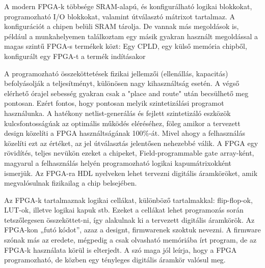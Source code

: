 \documentclass[a4paper,12pt,oneside]{book}
\begin{document}
A modern FPGA-k többsége SRAM-alapú, és konfigurálható logikai blokkokat, programozható I/O blokkokat, valamint útválasztó mátrixot tartalmaz. A konfigurációt a chipen belüli SRAM tárolja. De vannak más megoldások is, például a munkahelyemen találkoztam egy másik gyakran használt megoldással a magas szintű FPGA-s termékek közt: Egy CPLD, egy külső memória chipből, konfigurált egy FPGA-t a termék indításakor

A programozható összeköttetések fizikai jellemzői (ellenállás, kapacitás) befolyásolják a teljesítményt, különösen nagy kihasználtság esetén. A végső elérhető órajel sebesség gyakran csak a "place and route" után becsülhető meg pontosan. Ezért fontos, hogy pontosan melyik szintetizálási programot használunka. A hatékony netlist-generálás és fejlett szintetizáló eszközök kulcsfontosságúak az optimális működés eléréséhez, föleg amikor a tervezett design közelíti a FPGA használtságának 100\%-át. Mivel ahogy a felhasználás közelíti ezt az értéket, az jel útválasztás jelentősen nehezebbé válik.
\iffalse
A FPGA egy rövidítés, teljes nevükön ezeket a chipeket, Field-programmable gate array-ként, magyarul a felhasználás helyén programozható logikai kapumátrixokként ismerjük. Az FPGA-ra HDL nyelveken lehet tervezni digitális áramköröket, amik megvalósulnak fizikailag a chip belsejében. 

Az FPGA-k tartalmaznak logikai cellákat, különböző tartalmakkal: flip-flop-ok, LUT-ok, illetve logikai kapuk stb. Ezeket a cellákat lehet programozás során tetszőlegesen összeköttet-ni, így alakulnak ki a tervezett digitális áramkörök. Az FPGA-kon „futó kódot”, azaz a designt, firmwarenek szoktuk nevezni. A firmware szónak más az eredete, mégpedig a csak olvasható memóriába írt program, de az FPGA-k használata körül is elterjedt. A szó maga jól leírja, hogy a FPGA programozható, de közben egy tényleges digitális áramkör valósul meg.
\end{document}
